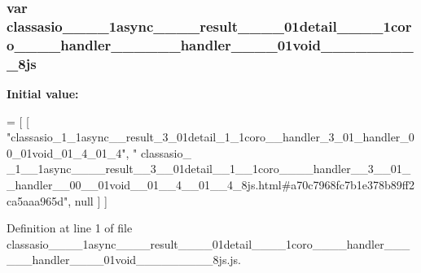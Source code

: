 \subsubsection[{classasio\+\_\+\+\_\+1\+\_\+\+\_\+1async\+\_\+\+\_\+\+\_\+\+\_\+result\+\_\+\+\_\+3\+\_\+\+\_\+01detail\+\_\+\+\_\+1\+\_\+\+\_\+1coro\+\_\+\+\_\+\+\_\+\+\_\+handler\+\_\+\+\_\+3\+\_\+\+\_\+01\+\_\+\+\_\+handler\+\_\+\+\_\+00\+\_\+\+\_\+01void\+\_\+\+\_\+01\+\_\+\+\_\+4\+\_\+\+\_\+01\+\_\+\+\_\+4\+\_\+8js}]{\setlength{\rightskip}{0pt plus 5cm}var classasio\+\_\+\+\_\+\_\+\+\_\+1async\+\_\+\+\_\+\+\_\+\+\_\+result\+\_\+\+\_\+\_\+\+\_\+01detail\+\_\+\+\_\+\_\+\+\_\+1coro\+\_\+\+\_\+\+\_\+\+\_\+handler\+\_\+\+\_\+\_\+\+\_\+\_\+\+\_\+handler\+\_\+\+\_\+\_\+\+\_\+01void\+\_\+\+\_\+\_\+\+\_\+\_\+\+\_\+\_\+\+\_\+\_\+8js}\label{classasio____1____1async________result____3____01detail____1____1coro________handler____3____01_915a8e25c3068799b2ef737d7dc642c6_acc2500547c9bbd716cfc1d3e5f050056}
{\bfseries Initial value\+:}
\begin{DoxyCode}
=
[
    [ \textcolor{stringliteral}{"classasio\_1\_1async\_\_result\_3\_01detail\_1\_1coro\_\_handler\_3\_01\_handler\_00\_01void\_01\_4\_01\_4"}, \textcolor{stringliteral}{"
      classasio\_
      \_1\_\_1async\_\_\_\_result\_\_3\_\_01detail\_\_1\_\_1coro\_\_\_\_handler\_\_3\_\_01\_\_handler\_\_00\_\_01void\_\_01\_\_4\_\_01\_\_4\_8js.html#a70c7968fc7b1e378b89ff2ca5aaa965d"}, null ]
]
\end{DoxyCode}


Definition at line 1 of file classasio\+\_\+\+\_\+\_\+\+\_\+1async\+\_\+\+\_\+\+\_\+\+\_\+result\+\_\+\+\_\+\_\+\+\_\+01detail\+\_\+\+\_\+\_\+\+\_\+1coro\+\_\+\+\_\+\+\_\+\+\_\+handler\+\_\+\+\_\+\_\+\+\_\+\_\+\+\_\+handler\+\_\+\+\_\+\_\+\+\_\+01void\+\_\+\+\_\+\_\+\+\_\+\_\+\+\_\+\_\+\+\_\+\_\+8js.\+js.

